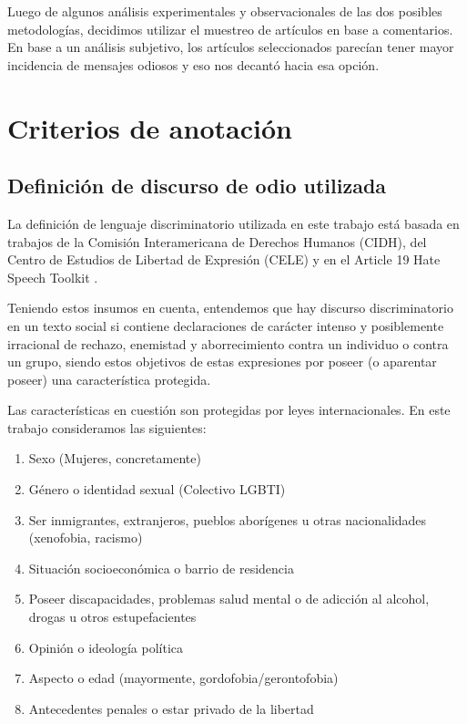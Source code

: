 Luego de algunos análisis experimentales y observacionales de las dos posibles metodologías, decidimos utilizar el muestreo de artículos en base a comentarios. En base a un análisis subjetivo, los artículos seleccionados parecían tener mayor incidencia de mensajes odiosos y eso nos decantó hacia esa opción.

\section{Criterios de anotación}
\label{sec:criterios}


\subsection{Definición de discurso de odio utilizada}

La definición de lenguaje discriminatorio utilizada en este trabajo está basada en trabajos de la Comisión Interamericana de Derechos Humanos (CIDH)\cite{CIDH2015}, del Centro de Estudios de Libertad de Expresión (CELE) \cite{cele2019} y en el Article 19 Hate Speech Toolkit \cite{article192015}.

Teniendo estos insumos en cuenta, entendemos que hay discurso discriminatorio en un texto social si contiene declaraciones de carácter intenso y posiblemente irracional de rechazo, enemistad y aborrecimiento contra un individuo o contra un grupo, siendo estos objetivos de estas expresiones por poseer (o aparentar poseer) una característica protegida.

Las características en cuestión son protegidas por leyes internacionales. En este trabajo consideramos las siguientes:

\begin{enumerate}
\item Sexo (Mujeres, concretamente)
\item Género o identidad sexual (Colectivo LGBTI)
\item Ser inmigrantes, extranjeros, pueblos aborígenes u otras nacionalidades (xenofobia, racismo)
\item Situación socioeconómica o barrio de residencia
\item Poseer discapacidades, problemas salud mental o de adicción al alcohol, drogas u otros estupefacientes
\item Opinión o ideología política
\item Aspecto o edad (mayormente, gordofobia/gerontofobia)
\item Antecedentes penales o estar privado de la libertad
\end{enumerate}

